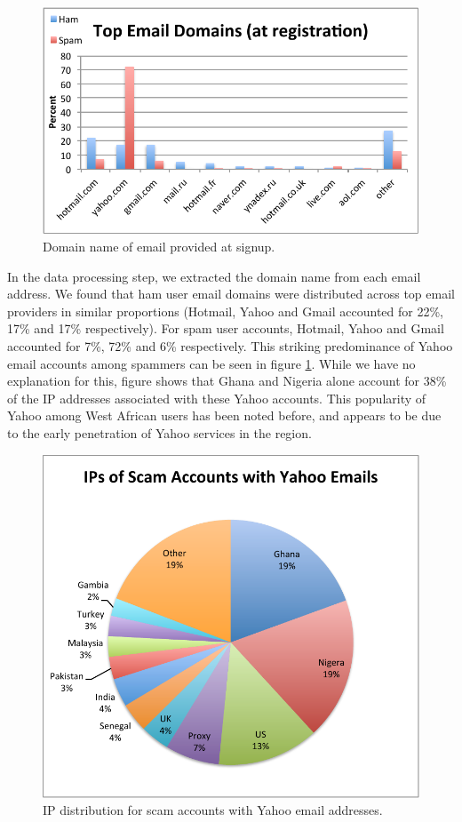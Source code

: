 \documentclass[preprint]{acm_proc_article-sp}
\begin{document}
\begin{figure}[h]
    \centering
    \includegraphics[width=\linewidth]{figures/email.pdf}
    \caption{Domain name of email provided at signup.}
    \label{fig:email}
\end{figure}

In the data processing step, we extracted the domain name from each email address. We found that ham user email domains 
were distributed across top email providers in similar proportions (Hotmail, Yahoo and Gmail accounted for 22\%, 17\% and 17\% 
respectively). For spam user accounts, Hotmail, Yahoo and Gmail accounted for 7\%, 72\% and 6\% respectively. This striking 
predominance of Yahoo email accounts among spammers can be seen in figure \ref{fig:email}. While we have no explanation for 
this, figure \cite{fig:ysmap} shows that Ghana and Nigeria alone account for 38\% of the IP addresses associated with these 
Yahoo accounts. This popularity of Yahoo among West African users has been noted before\cite{burrell}, and appears to be 
due to the early penetration of Yahoo services in the region.

\begin{figure}[h]
    \centering
    \includegraphics[width=\linewidth]{figures/yahoo-spam.pdf}
    \caption{IP distribution for scam accounts with Yahoo email addresses.}
    \label{fig:yspam}
\end{figure}
\end{document}

